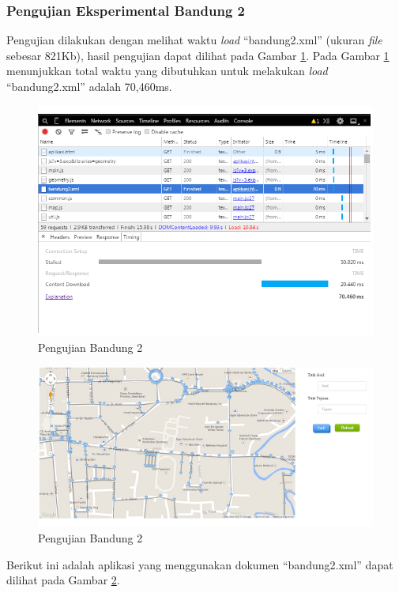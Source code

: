 \subsubsection{Pengujian Eksperimental Bandung 2}
Pengujian dilakukan dengan melihat waktu \textit{load} ``bandung2.xml'' (ukuran
\textit{file} sebesar 821Kb), hasil pengujian dapat dilihat pada Gambar
\ref{fig:pu_bandung2}. Pada Gambar \ref{fig:pu_bandung2} menunjukkan total waktu yang dibutuhkan untuk 
melakukan \textit{load} ``bandung2.xml'' adalah 70,460ms. 
\begin{figure}[h]
\centering
\includegraphics[scale=0.68]{Gambar/pu_bandung2}
\caption[Pengujian Bandung 2]{Pengujian Bandung 2}
\label{fig:pu_bandung2}
\end{figure}
\begin{figure}[h]
\centering
\includegraphics[scale=0.43]{Gambar/bandung2_load}
\caption[Pengujian Bandung 2]{Pengujian Bandung 2}
\label{fig:bandung2_load}
\end{figure}
\clearpage
Berikut ini adalah aplikasi yang menggunakan dokumen ``bandung2.xml'' dapat
dilihat pada Gambar \ref{fig:bandung2_load}.

